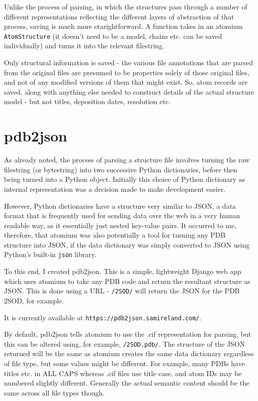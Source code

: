 Unlike the process of parsing, in which the structures pass through a number of different representations reflecting the different layers of abstraction of that process, saving is much more starightforward. A function takes in an atomium \texttt{AtomStructure} (it doesn't need to be a model, chains etc. can be saved individually) and turns it into the relevant filestring.

Only structural information is saved - the various file annotations that are parsed from the original files are presumed to be properties solely of those original files, and not of any modified versions of them that might exist. So, atom records are saved, along with anything else needed to construct details of the actual structure model - but not titles, deposition dates, resolution etc.

\section{pdb2json}

As already noted, the process of parsing a structure file involves turning the raw filestring (or bytestring) into two successive Python dictionaries, before then being turned into a Python object. Initially this choice of Python dictionary as internal representation was a decision made to make development easier.

However, Python dictionaries have a structure very similar to JSON, a data format that is frequently used for sending data over the web in a very human readable way, as it essentially just nested key-value pairs. It occurred to me, therefore, that atomium was also potentially a tool for turning any PDB structure into JSON, if the data dictionary was simply converted to JSON using Python's built-in \texttt{json} library.

To this end, I created pdb2json. This is a simple, lightweight Django web app which uses atomium to take any PDB code and return the resultant structure as JSON. This is done using a URL - \texttt{/2SOD/} will return the JSON for the PDB 2SOD, for example.

It is currently available at \texttt{https://pdb2json.samireland.com/}.

By default, pdb2json tells atomium to use the .cif representation for parsing, but this can be altered using, for example, \texttt{/2SOD.pdb/}. The structure of the JSON returned will be the same as atomium creates the same data dictionary regardless of file type, but some values might be different. For example, many PDBs have titles etc. in ALL CAPS whereas .cif files use title case, and atom IDs may be numbered slightly different. Generally the actual semantic content should be the same across all file types though.

